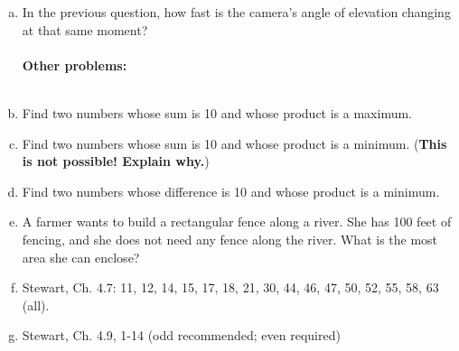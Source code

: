 \documentclass[12pt]{article}
\begin{document}
\begin{enumerate}[(a)]
\item
In the previous question, how fast is the camera's angle of elevation
changing at that same moment?
\\
\\
{\bf Other problems:}
\\
\\
\item
Find two numbers whose sum is 10 and whose product is a maximum.

\item
Find two numbers whose sum is 10 and whose product is a minimum.
({\bf This is not possible! Explain why.})

\item
Find two numbers whose difference is 10 and whose product is a minimum.

\item
A farmer wants to build a rectangular fence along a river. She has 100 feet of fencing,
and she does not need any fence along the river. What is the most area she can
enclose?

\item
Stewart, Ch. 4.7: 11, 12, 14, 15, 17, 18, 21, 30, 44, 46, 47, 50, 52, 
55, 58, 63 (all).

\item
Stewart, Ch. 4.9, 1-14 (odd recommended; even required)

\end{enumerate}
\end{document}
